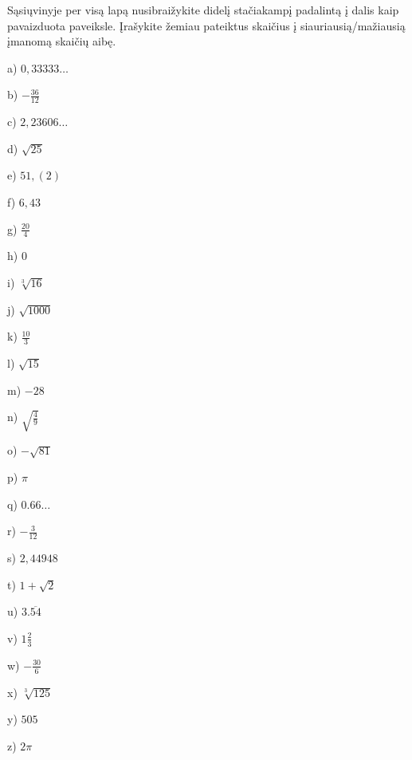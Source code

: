 \setcounter{teorema}{0}
\begin{uzd}
Sąsiųvinyje per visą lapą nusibraižykite didelį stačiakampį padalintą į dalis kaip pavaizduota paveiksle.
Įrašykite žemiau pateiktus skaičius į siauriausią/mažiausią įmanomą skaičių aibę.
\begin{multicols}{7}
a) $0,33333 \ldots$

b) $-\frac{36}{12}$

c) $2,23606 \ldots$

d) $\sqrt{25}$

e) $51,(2)$

f) $6,43$

g) $\frac{20}{4}$

h) $0$

i) $\sqrt[3]{16}$

j) $\sqrt{1000}$

k) $\frac{10}{3}$

l) $\sqrt{15}$

m) $-28$

n) $\sqrt{\frac{4}{9}}$

o) $-\sqrt{81}$

p) $\pi$

q) $0.66 \ldots$

r) $-\frac{3}{12}$

s) $2,44948$

t) $1+\sqrt{2}$

u) $3.\overline{54}$

v) $1 \frac{2}{3}$

w) $-\frac{30}{6}$

x) $\sqrt[3]{125}$

y) $505$

z) $2 \pi$
\end{multicols}

\begin{center}
\end{center}
\end{uzd}